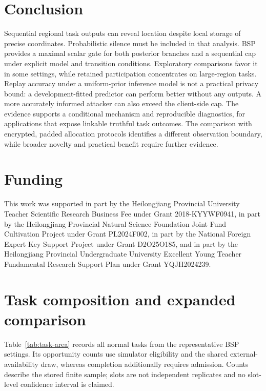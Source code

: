 \documentclass[3p,times]{elsarticle}
\begin{document}
\section{Conclusion}
Sequential regional task outputs can reveal location despite local storage of precise coordinates. Probabilistic silence must be included in that analysis. BSP provides a maximal scalar gate for both posterior branches and a sequential cap under explicit model and transition conditions. Exploratory comparisons favor it in some settings, while retained participation concentrates on large-region tasks. Replay accuracy under a uniform-prior inference model is not a practical privacy bound: a development-fitted predictor can perform better without any outputs. A more accurately informed attacker can also exceed the client-side cap. The evidence supports a conditional mechanism and reproducible diagnostics, for applications that expose linkable truthful task outcomes. The comparison with encrypted, padded allocation protocols identifies a different observation boundary, while broader novelty and practical benefit require further evidence.

\section*{Funding}
This work was supported in part by the Heilongjiang Provincial University Teacher Scientific Research Business Fee under Grant 2018-KYYWF0941, in part by the Heilongjiang Provincial Natural Science Foundation Joint Fund Cultivation Project under Grant PL2024F002, in part by the National Foreign Expert Key Support Project under Grant D2O25O185, and in part by the Heilongjiang Provincial Undergraduate University Excellent Young Teacher Fundamental Research Support Plan under Grant YQJH2024239.

\appendix
\setcounter{figure}{0}
\setcounter{table}{0}
\renewcommand{\theHfigure}{appendix.\arabic{figure}}
\renewcommand{\theHtable}{appendix.\arabic{table}}
\section{Task composition and expanded comparison}
\label{sec:diagnostics}
Table~\ref{tab:task-area} records all normal tasks from the representative BSP settings. Its opportunity counts use simulator eligibility and the shared external-availability draw, whereas completion additionally requires admission. Counts describe the stored finite sample; slots are not independent replicates and no slot-level confidence interval is claimed.
\begin{table}[htbp]
\centering\small
\caption{Post-review task-area breakdown for executed BSP $\rho=0.1$ under adaptive probes. Area is the number of cells in the original 64-cell region library. Retention is completed/opportunities. Counts are pooled over 80 synthetic trajectories or 67 replay users; these are not policy-envelope mixtures.}
\label{tab:task-area}
\end{table}
\end{document}
